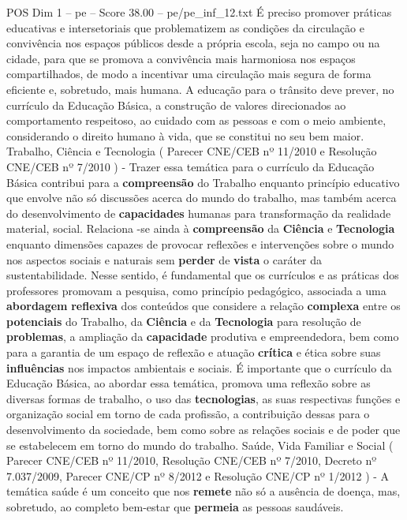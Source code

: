 \begin{textsample}{POS Dim 1 – pe – Score 38.00 – pe/pe\_inf\_12.txt}
É preciso promover práticas educativas e intersetoriais que problematizem as condições da circulação e convivência nos espaços públicos desde a própria escola, seja no campo ou na cidade, para que se promova a convivência mais harmoniosa nos espaços compartilhados, de modo a incentivar uma circulação mais segura de forma eficiente e, sobretudo, mais humana.
A educação para o trânsito deve prever, no currículo da Educação Básica, a construção de valores direcionados ao comportamento respeitoso, ao cuidado com as pessoas e com o meio ambiente, considerando o direito humano à vida, que se constitui no seu bem maior.
Trabalho, Ciência e Tecnologia ( Parecer CNE/CEB nº 11/2010 e Resolução CNE/CEB nº 7/2010 ) - Trazer essa temática para o currículo da Educação Básica contribui para a \textbf{compreensão} do Trabalho enquanto princípio educativo que envolve não só discussões acerca do mundo do trabalho, mas também acerca do desenvolvimento de \textbf{capacidades} humanas para transformação da realidade material, social.
Relaciona -se ainda à \textbf{compreensão} da \textbf{Ciência} e \textbf{Tecnologia} enquanto dimensões capazes de provocar reflexões e intervenções sobre o mundo nos aspectos sociais e naturais sem \textbf{perder} de \textbf{vista} o caráter da sustentabilidade.
Nesse sentido, é fundamental que os currículos e as práticas dos professores promovam a pesquisa, como princípio pedagógico, associada a uma \textbf{abordagem} \textbf{reflexiva} dos conteúdos que considere a relação \textbf{complexa} entre os \textbf{potenciais} do Trabalho, da \textbf{Ciência} e da \textbf{Tecnologia} para resolução de \textbf{problemas}, a ampliação da \textbf{capacidade} produtiva e empreendedora, bem como para a garantia de um espaço de reflexão e atuação \textbf{crítica} e ética sobre suas \textbf{influências} nos impactos ambientais e sociais.
É importante que o currículo da Educação Básica, ao abordar essa temática, promova uma reflexão sobre as diversas formas de trabalho, o uso das \textbf{tecnologias}, as suas respectivas funções e organização social em torno de cada profissão, a contribuição dessas para o desenvolvimento da sociedade, bem como sobre as relações sociais e de poder que se estabelecem em torno do mundo do trabalho.
Saúde, Vida Familiar e Social ( Parecer CNE/CEB nº 11/2010, Resolução CNE/CEB nº 7/2010, Decreto nº 7.037/2009, Parecer CNE/CP nº 8/2012 e Resolução CNE/CP nº 1/2012 ) - A temática saúde é um conceito que nos \textbf{remete} não só a ausência de doença, mas, sobretudo, ao completo bem-estar que \textbf{permeia} as pessoas saudáveis.

\end{textsample}
